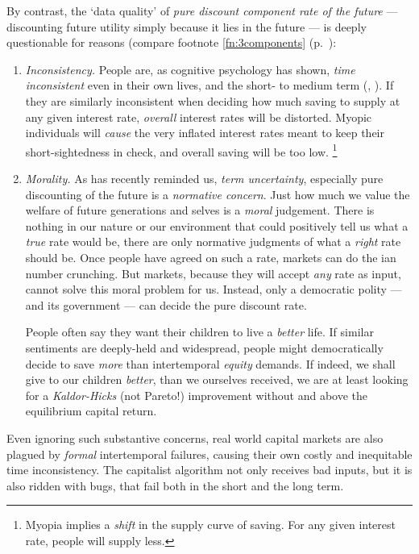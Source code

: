 By contrast, the `data quality' of \emph{pure discount component rate of the future} --- discounting future utility simply because it lies in the future --- is deeply questionable for reasons (compare footnote \ref{fn:3components} (p.~\pageref{fn:3components}):

\begin{enumerate}
	\item \emph{Inconsistency.} People are, as cognitive psychology has shown, \emph{time inconsistent} even in their own lives, and the short- to medium term (\citealt{Ainslie1975}, \citealt{Thaler1981}).
	If they are similarly inconsistent  when deciding how much saving to supply at any given interest rate, \emph{overall} interest rates will be distorted.
	Myopic individuals will \emph{cause} the very inflated interest rates meant to keep their short-sightedness in check, and overall saving will be too low.
	\footnote{
		Myopia implies a \emph{shift} in the supply curve of saving.
		For any given interest rate, people will supply less.
	}
	\item \emph{Morality.} As \cite[54]{Samuelson2005} has recently reminded us, \emph{term uncertainty}, especially pure discounting of the future is a \emph{normative concern}.
Just how much we value the welfare of future generations and selves is a \emph{moral} judgement.
There is nothing in our nature or our environment that could positively tell us what a \emph{true} rate would be, there are only normative judgments of what a \emph{right} rate should be.
Once people have agreed on such a rate, markets can do the \citeauthor{Hayek1931}ian number crunching.
But markets, because they will accept \emph{any} rate as input, cannot solve this moral problem for us.
Instead, only a democratic polity --- and its government --- can decide the pure discount rate.

	People often say they want their children to live a \emph{better} life.
If similar sentiments are deeply-held and widespread, people might democratically decide to save \emph{more} than intertemporal \emph{equity} demands.
If indeed, we shall give to our children \emph{better}, than we ourselves received, we are at least looking for a \emph{Kaldor-Hicks} (not Pareto!) improvement without and above the equilibrium capital return.
\end{enumerate}

Even ignoring such substantive concerns, real world capital markets are also plagued by \emph{formal} intertemporal failures, causing their own costly and inequitable time inconsistency.
The capitalist algorithm not only receives bad inputs, but it is also ridden with bugs, that fail both in the short and the long term.

